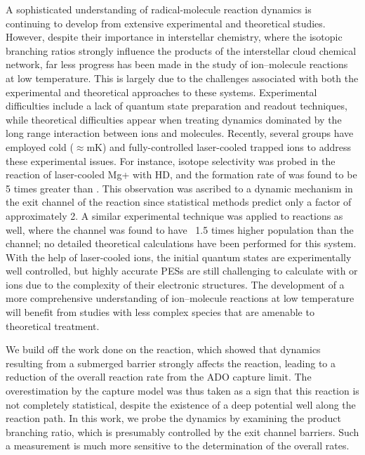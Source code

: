 A sophisticated understanding of radical-molecule reaction dynamics is continuing to develop from extensive experimental and theoretical studies. However, despite their importance in interstellar chemistry, where the isotopic branching ratios strongly influence the products of the interstellar cloud chemical network, far less progress has been made in the study of ion–molecule reactions at low temperature. This is largely due to the challenges associated with both the experimental and theoretical approaches to these systems.\cite{Clary1990,Dateo1989,Adams1976,Armentrout2002,Sims2002,Smith2000,Snow2008} Experimental difficulties include a lack of quantum state preparation and readout techniques, while theoretical difficulties appear when treating dynamics dominated by the long range interaction between ions and molecules. Recently, several groups have employed cold ($\approx$mK) and fully-controlled laser-cooled trapped ions to address these experimental issues. For instance, isotope selectivity was probed in the reaction of laser-cooled Mg+ with HD, and the formation rate of  was found to be 5 times greater than . This observation was ascribed to a dynamic mechanism in the exit channel of the reaction since statistical methods predict only a factor of approximately 2.\cite{Dalleska2005} A similar experimental technique was applied to  reactions as well,\cite{Hansen2012} where the  channel was found to have ~1.5 times higher population than the  channel; no detailed theoretical calculations have been performed for this system. With the help of laser-cooled ions, the initial quantum states are experimentally well controlled, but highly accurate PESs are still challenging to calculate with  or  ions due to the complexity of their electronic structures. The development of a more comprehensive understanding of ion–molecule reactions at low temperature will benefit from studies with less complex species that are amenable to theoretical treatment.

We build off the work done on the  reaction, which showed that dynamics resulting from a submerged barrier strongly affects the reaction, leading to a reduction of the overall reaction rate from the ADO capture limit. The overestimation by the capture model was thus taken as a sign that this reaction is not completely statistical, despite the existence of a deep  potential well along the reaction path. In this work, we probe the dynamics by examining the product branching ratio, which is presumably controlled by the exit channel barriers. Such a measurement is much more sensitive to the determination of the overall rates.

